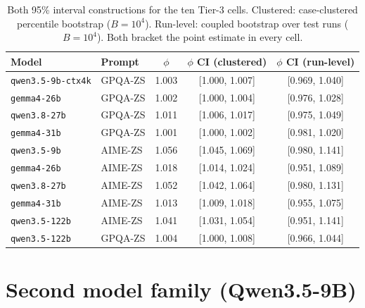 \documentclass{article}
\begin{document}
\begin{table}[H]
\centering
\caption{Both 95\% interval constructions for the ten Tier-3 cells.
Clustered: case-clustered percentile bootstrap ($B=10^4$). Run-level:
coupled bootstrap over test runs ($B=10^4$). Both bracket the point
estimate in every cell.}
\label{tab:ci}
\begin{tabular}{llccc}
\toprule
Model & Prompt & $\phi$ & $\phi$ CI (clustered) & $\phi$ CI (run-level) \\
\midrule
\texttt{qwen3.5-9b-ctx4k} & GPQA-ZS & 1.003 & [1.000, 1.007] & [0.969, 1.040] \\
\texttt{gemma4-26b} & GPQA-ZS & 1.002 & [1.000, 1.004] & [0.976, 1.028] \\
\texttt{qwen3.8-27b} & GPQA-ZS & 1.011 & [1.006, 1.017] & [0.975, 1.049] \\
\texttt{gemma4-31b} & GPQA-ZS & 1.001 & [1.000, 1.002] & [0.981, 1.020] \\
\texttt{qwen3.5-9b} & AIME-ZS & 1.056 & [1.045, 1.069] & [0.980, 1.141] \\
\texttt{gemma4-26b} & AIME-ZS & 1.018 & [1.014, 1.024] & [0.951, 1.089] \\
\texttt{qwen3.8-27b} & AIME-ZS & 1.052 & [1.042, 1.064] & [0.980, 1.131] \\
\texttt{gemma4-31b} & AIME-ZS & 1.013 & [1.009, 1.018] & [0.955, 1.075] \\
\texttt{qwen3.5-122b} & AIME-ZS & 1.041 & [1.031, 1.054] & [0.951, 1.141] \\
\texttt{qwen3.5-122b} & GPQA-ZS & 1.004 & [1.000, 1.008] & [0.966, 1.044] \\
\bottomrule
\end{tabular}
\end{table}

\section{Second model family (Qwen3.5-9B)}
\label{app:qwen}
\end{document}
